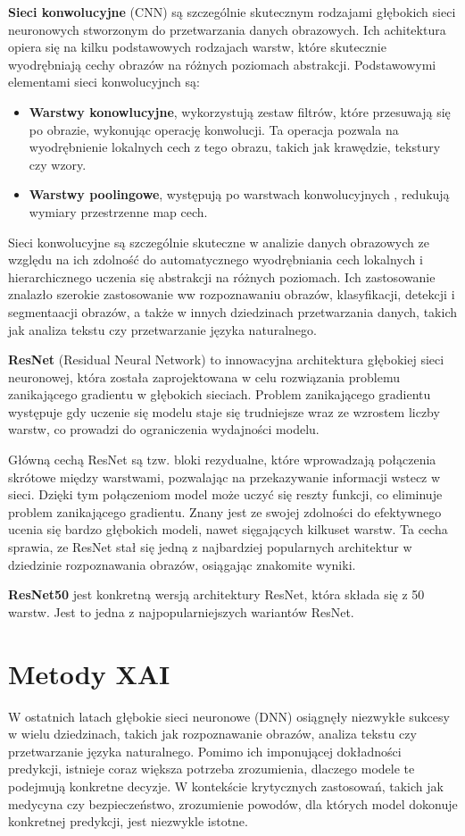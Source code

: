\textbf{Sieci konwolucyjne} (CNN) są szczególnie skutecznym rodzajami głębokich sieci neuronowych stworzonym do przetwarzania danych obrazowych.
Ich achitektura opiera się na kilku podstawowych rodzajach warstw, które skutecznie wyodrębniają cechy obrazów na różnych poziomach abstrakcji.
Podstawowymi elementami sieci konwolucyjnch są:
\begin{itemize}
	\item \textbf{Warstwy konowlucyjne}, wykorzystują zestaw filtrów, które przesuwają się po obrazie, wykonując operację konwolucji.
	      Ta operacja pozwala na wyodrębnienie lokalnych cech z tego obrazu, takich jak krawędzie, tekstury czy wzory.
	\item \textbf{Warstwy poolingowe}, występują po warstwach konwolucyjnych , redukują wymiary przestrzenne map cech.
\end{itemize}
Sieci konwolucyjne są szczególnie skuteczne w analizie danych obrazowych ze względu na ich zdolność do automatycznego wyodrębniania cech lokalnych i hierarchicznego uczenia się abstrakcji na różnych poziomach.
Ich zastosowanie znalazło szerokie zastosowanie ww rozpoznawaniu obrazów, klasyfikacji, detekcji i segmentaacji obrazów, a także w innych dziedzinach przetwarzania danych, takich jak analiza tekstu czy przetwarzanie języka naturalnego.

\textbf{ResNet} (Residual Neural Network) to innowacyjna architektura głębokiej sieci neuronowej, która została zaprojektowana w celu rozwiązania problemu zanikającego gradientu w głębokich sieciach.
Problem zanikającego gradientu występuje gdy uczenie się modelu staje się trudniejsze wraz ze wzrostem liczby warstw, co prowadzi do ograniczenia wydajności modelu.

Główną cechą ResNet są tzw. bloki rezydualne, które wprowadzają połączenia skrótowe między warstwami, pozwalając na przekazywanie informacji wstecz w sieci.
Dzięki tym połączeniom model może uczyć się reszty funkcji, co eliminuje problem zanikającego gradientu.
Znany jest ze swojej zdolności do efektywnego ucenia się bardzo głębokich modeli, nawet sięgających kilkuset warstw.
Ta cecha sprawia, ze ResNet stał się jedną z najbardziej popularnych architektur w dziedzinie rozpoznawania obrazów, osiągając znakomite wyniki.

\textbf{ResNet50} jest konkretną wersją architektury ResNet, która składa się z 50 warstw.
Jest to jedna z najpopularniejszych wariantów ResNet.

\section*{Metody XAI}
W ostatnich latach głębokie sieci neuronowe (DNN) osiągnęły niezwykłe sukcesy w wielu dziedzinach, takich jak rozpoznawanie obrazów, analiza tekstu czy przetwarzanie języka naturalnego.
Pomimo ich imponującej dokładności predykcji, istnieje coraz większa potrzeba zrozumienia, dlaczego modele te podejmują konkretne decyzje.
W kontekście krytycznych zastosowań, takich jak medycyna czy bezpieczeństwo, zrozumienie powodów, dla których model dokonuje konkretnej predykcji, jest niezwykle istotne.

